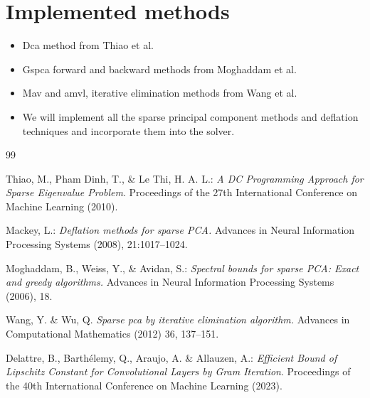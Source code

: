 \documentclass[fleqn]{report} %
\begin{document}
\section{Implemented methods} 
\begin{itemize}
\item Dca method from Thiao et al.
\item Gspca forward and backward methods from Moghaddam et al.
\item Mav and amvl, iterative elimination methods from Wang et al.
\item We will implement all the sparse principal component methods and deflation techniques and incorporate them into the solver.
\end{itemize}
\begin{thebibliography}{99} %

Thiao, M., Pham Dinh, T., \& Le Thi, H. A. L.: \textit{A DC Programming Approach for Sparse Eigenvalue Problem}. Proceedings of the 27th International Conference on Machine Learning (2010).

Mackey, L.: \textit{Deflation methods for sparse PCA.} Advances in Neural Information Processing Systems (2008), 21:1017–1024.

Moghaddam, B., Weiss, Y., \& Avidan, S.: \textit{Spectral bounds for sparse PCA: Exact and greedy
algorithms.} Advances in Neural Information Processing Systems (2006), 18.

Wang, Y. \& Wu, Q.  \textit{Sparse pca by iterative elimination algorithm.} Advances in Computational
Mathematics (2012) 36, 137–151.

Delattre, B., Barthélemy, Q., Araujo, A. \& Allauzen, A.:  \textit{Efficient Bound of Lipschitz Constant for Convolutional Layers by Gram Iteration}. Proceedings of the 40th International Conference on Machine Learning (2023).

\end{thebibliography}
\end{document}
